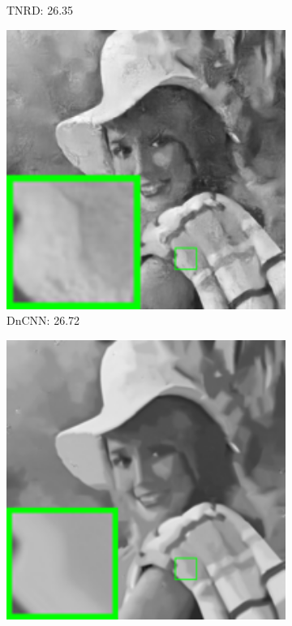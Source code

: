\begin{figure}
\begin{adjustwidth}{-2cm}{}
\begin{subfigure}[t]{0.19\textwidth}
		\caption{TNRD: 26.35}
    \end{subfigure}
    \hfill
    \begin{subfigure}[t]{0.19\textwidth}
        \centering
        \includegraphics[width=1\textwidth]{images/twsc/awgn/resize_br_DnCNN_80_elaine.png}
		\caption{DnCNN: 26.72}
    \end{subfigure}
    \hfill
    \begin{subfigure}[t]{0.19\textwidth}
        \centering
        \includegraphics[width=1\textwidth]{images/twsc/awgn/resize_br_WSC_80_elaine.png}

\end{subfigure}
\end{adjustwidth}
\end{figure}
